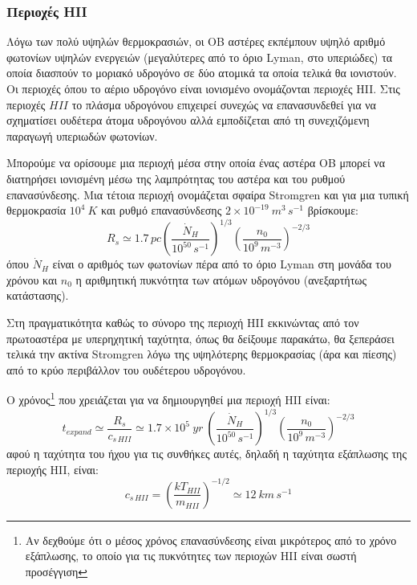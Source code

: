 \documentclass[a4paper,12pt]{memoir}
\newcommand{\e}[1]{\times 10^{#1}}
\newcommand{\f}[3]{\left( \frac{#1}{#2} \right) ^{#3} }
\begin{document}
\subsubsection{Περιοχές HII}
\label{par:HII regions}
Λόγω των πολύ υψηλών θερμοκρασιών, οι OB αστέρες εκπέμπουν υψηλό αριθμό φωτονίων υψηλών ενεργειών (μεγαλύτερες από το όριο Lyman, στο υπεριώδες) τα οποία διασπούν το μοριακό υδρογόνο σε δύο ατομικά τα οποία τελικά θα ιονιστούν. Οι περιοχές όπου το αέριο υδρογόνο είναι ιονισμένο ονομάζονται περιοχές HII. Στις περιοχές $HII$ το πλάσμα υδρογόνου επιχειρεί συνεχώς να επανασυνδεθεί για να σχηματίσει ουδέτερα άτομα υδρογόνου αλλά εμποδίζεται από τη συνεχιζόμενη παραγωγή υπεριωδών φωτονίων.

Μπορούμε να ορίσουμε μια περιοχή μέσα στην οποία ένας αστέρα OB μπορεί να διατηρήσει ιονισμένη μέσω της λαμπρότητας του αστέρα και του ρυθμού επανασύνδεσης. Μια τέτοια περιοχή ονομάζεται σφαίρα Stromgren και για μια τυπική θερμοκρασία $10^4 \ K$ και ρυθμό επανασύνδεσης $2 \e{-19} \ m^3 \,s^{-1}$ βρίσκουμε:
\begin{equation}
R_s \simeq 1.7 \, pc \left( \frac{\dot{N}_H}{10^{50} \, s^{-1}} \right)^{1/3} \left( \frac{n_0}{10^9 \, m^{-3}} \right) ^{-2/3}
\end{equation}
όπου $\dot{N}_H$ είναι ο αριθμός των φωτονίων πέρα από το όριο Lyman στη μονάδα του χρόνου και $n_0$ η αριθμητική πυκνότητα των ατόμων υδρογόνου (ανεξαρτήτως κατάστασης).

Στη πραγματικότητα καθώς το σύνορο της περιοχή HII εκκινώντας από τον πρωτοαστέρα με υπερηχητική ταχύτητα, όπως θα δείξουμε παρακάτω, θα ξεπεράσει τελικά την ακτίνα Stromgren λόγω της υψηλότερης θερμοκρασίας (άρα και πίεσης) από το κρύο περιβάλλον του ουδέτερου υδρογόνου. 

Ο χρόνος\footnote{Aν δεχθούμε ότι ο μέσος χρόνος επανασύνδεσης είναι μικρότερος από το χρόνο εξάπλωσης, το οποίο για τις πυκνότητες των περιοχών HII είναι σωστή προσέγγιση} που χρειάζεται για να δημιουργηθεί μια περιοχή HII είναι:
\begin{equation}
t_{expand} \simeq \frac{R_s}{c_{s \, HII}} \simeq 1.7\e{5} \ yr \ \f{\dot{N}_H}{10^{50} \, s^{-1}}{1/3} \f{n_0}{10^9 \, m^{-3}}{-2/3}
\end{equation}
αφού η ταχύτητα του ήχου για τις συνθήκες αυτές, δηλαδή η ταχύτητα εξάπλωσης της περιοχής HII, είναι:
\begin{equation}
c_{s \, HII} = \f{kT_{HII}}{m_{HII}}{-1/2} \simeq 12 \ km\,s^{-1}
\end{equation}
\end{document}
